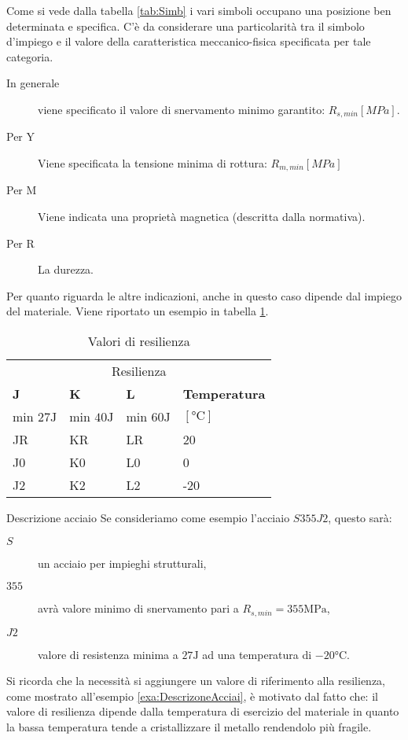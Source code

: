 Come si vede dalla tabella \ref{tab:Simb} i vari simboli occupano una posizione ben determinata e specifica.
C'è da considerare una particolarità tra il simbolo d'impiego e il valore della caratteristica meccanico-fisica specificata per tale categoria.
\begin{description}
\item[In generale] viene specificato il valore di snervamento minimo garantito: $R_{s,min}\left[\unit{MPa}\right]$.
\item[Per Y] Viene specificata la tensione minima di rottura: $R_{m,min}\left[\unit{MPa}\right]$
\item[Per M] Viene indicata una proprietà magnetica (descritta dalla normativa).
\item[Per R] La durezza.
\end{description}
Per quanto riguarda le altre indicazioni, anche in questo caso dipende dal impiego del materiale.
Viene riportato un esempio in tabella \ref{tab:ValRes}.

\begin{table}
\centering
\caption{Valori di resilienza}\label{tab:ValRes}
\begin{tabularx}{\textwidth}{XXXX}
\toprule
\multicolumn{4}{c}{Resilienza}\\
\textbf{J} & \textbf{K} & \textbf{L} & \textbf{Temperatura}\\
min $27\unit{\J}$ & min $40\unit{\J}$ & min $60\unit{\J}$ & $\left[\unit{\celsius}\right]$\\
\midrule
JR & KR & LR & 20\\
J0 & K0 & L0 & 0\\
J2 & K2 & L2 & -20\\
\bottomrule
\end{tabularx}
\end{table}

\begin{example}{Descrizione acciaio}
Se consideriamo come esempio l'acciaio $S355J2$, questo sarà:
\begin{description}
\item[$S$] un acciaio per impieghi strutturali,
\item[$355$] avrà valore minimo di snervamento pari a $R_{s,min} = 355\unit{\MPa}$,
\item[$J2$] valore di resistenza minima a $27\unit{\J}$ ad una temperatura di $-20\unit{\celsius}$.
\end{description}\label{exa:DescrizoneAcciai}
\end{example}%
Si ricorda che la necessità si aggiungere un valore di riferimento alla resilienza, come mostrato all'esempio \ref{exa:DescrizoneAcciai}, è motivato dal fatto che: il valore di resilienza dipende dalla temperatura di esercizio del materiale in quanto la bassa temperatura tende a cristallizzare il metallo rendendolo più fragile.

